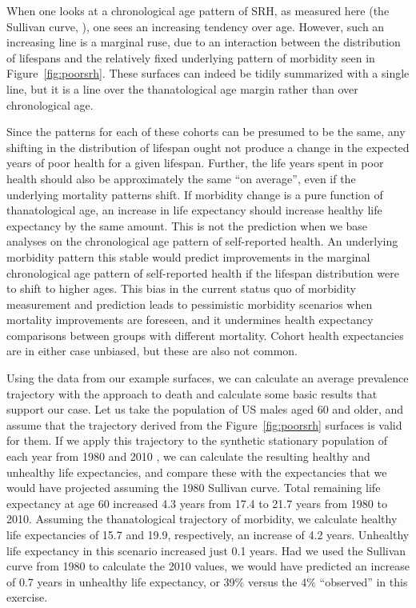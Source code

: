 \documentclass[12pt,oneside,a4paper]{article} %
\begin{document}
When one looks at a chronological age pattern of SRH, as measured
here (the Sullivan curve, \citep{Sullivan1970}), one sees an increasing tendency
over age.
However, such an increasing line is a marginal ruse, due to an interaction
between the distribution of lifespans and the relatively fixed underlying
pattern of morbidity seen in Figure~\ref{fig:poorsrh}. These surfaces can indeed
be tidily summarized with a single line, but it is a line over the
thanatological age margin rather than over chronological age. 

Since the patterns for each of these cohorts can be presumed to be the same, any
shifting in the distribution of lifespan ought not produce a change in the
expected years of poor health for a given lifespan. Further, the life years
spent in poor health should also be approximately the same ``on average'', even
if the underlying mortality patterns shift. If morbidity change is a pure
function of thanatological age, an increase in life expectancy should increase
healthy life expectancy by the same amount. This is not the prediction when we
base analyses on the chronological age pattern of self-reported health. An
underlying morbidity pattern this stable would predict improvements in the
marginal chronological age pattern of self-reported health if the lifespan
distribution were to shift to higher ages. This bias in the current status quo
of morbidity measurement and prediction leads to pessimistic morbidity scenarios
when mortality improvements are foreseen, and it undermines health expectancy
comparisons between groups with different mortality. Cohort health expectancies
are in either case unbiased, but these are also not common.

Using the data from our example surfaces, we can calculate an average prevalence
trajectory with the approach to death and calculate some basic results that
support our case. Let us take the population of US males aged 60 and older, and
assume that the trajectory derived from the Figure~\ref{fig:poorsrh} surfaces
is valid for them.
If we apply this trajectory to the synthetic stationary population of each
year from 1980 and 2010 \citep{HMD}, we can calculate the resulting healthy and
unhealthy life expectancies, and compare these with the expectancies that we would have projected assuming the 1980 Sullivan curve.
Total remaining life expectancy at age 60 increased 4.3 years from 17.4 to 21.7
years from 1980 to 2010. Assuming the thanatological trajectory of
morbidity, we calculate healthy life expectancies of 15.7 and 19.9,
respectively, an increase of 4.2 years. Unhealthy life expectancy in this
scenario increased just 0.1 years. Had we used the Sullivan curve from 1980 to
calculate the 2010 values, we would have predicted an increase of 0.7 years in
unhealthy life expectancy, or 39\% versus the 4\% ``observed'' in this
exercise.
\end{document}
